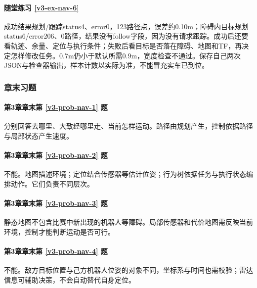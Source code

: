 \paragraph*{随堂练习 \ref{v3-ex-nav-6}}
\begin{solution}
成功结果规划/跟踪status4、error0，123路径点，误差约0.10m；障碍内目标规划status6/error206、0路径，结果没有follow字段，因为没有请求跟踪。成功后还要看轨迹、余量、定位与执行条件；失败后看目标是否落在障碍、地图和TF，再决定怎样修改任务。0.7m仍小于默认所需0.9m，宽度检查不通过。保存自己两次JSON与检查器输出，样本计数以实际为准，不能冒充实车已到位。
\end{solution}

\subsubsection*{章末习题}
\paragraph*{第3章章末第 \ref{v3-prob-nav-1} 题}
\begin{solution}
分别回答去哪里、大致经哪里走、当前怎样运动。路径由规划产生，控制依据路径与局部状态产生速度。
\end{solution}

\paragraph*{第3章章末第 \ref{v3-prob-nav-2} 题}
\begin{solution}
不能。地图描述环境；定位结合传感器等估计位姿；行为树依据任务与执行状态编排动作。它们负责不同层次。
\end{solution}

\paragraph*{第3章章末第 \ref{v3-prob-nav-3} 题}
\begin{solution}
静态地图不包含比赛中新出现的机器人等障碍。局部传感器和代价地图需反映当前环境，控制才能判断运动是否可行。
\end{solution}

\paragraph*{第3章章末第 \ref{v3-prob-nav-4} 题}
\begin{solution}
不能。敌方目标位置与己方机器人位姿的对象不同，坐标系与时间也需校验；雷达信息可辅助决策，不会自动替代自身定位。
\end{solution}

